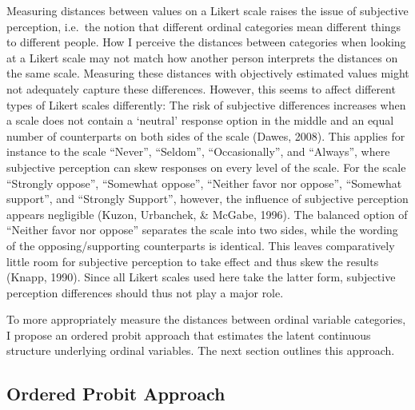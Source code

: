 \documentclass[12pt,econ]{sources/authesis}
\begin{document}
Measuring distances between values on a Likert scale raises the issue of subjective perception, i.e.~the notion that different ordinal categories mean different things to different people. How I perceive the distances between categories when looking at a Likert scale may not match how another person interprets the distances on the same scale. Measuring these distances with objectively estimated values might not adequately capture these differences. However, this seems to affect different types of Likert scales differently: The risk of subjective differences increases when a scale does not contain a `neutral' response option in the middle and an equal number of counterparts on both sides of the scale (Dawes, 2008). This applies for instance to the scale ``Never'', ``Seldom'', ``Occasionally'', and ``Always'', where subjective perception can skew responses on every level of the scale. For the scale ``Strongly oppose'', ``Somewhat oppose'', ``Neither favor nor oppose'', ``Somewhat support'', and ``Strongly Support'', however, the influence of subjective perception appears negligible (Kuzon, Urbanchek, \& McGabe, 1996). The balanced option of ``Neither favor nor oppose'' separates the scale into two sides, while the wording of the opposing/supporting counterparts is identical. This leaves comparatively little room for subjective perception to take effect and thus skew the results (Knapp, 1990). Since all Likert scales used here take the latter form, subjective perception differences should thus not play a major role.

To more appropriately measure the distances between ordinal variable categories, I propose an ordered probit approach that estimates the latent continuous structure underlying ordinal variables. The next section outlines this approach.

\hypertarget{ordblock-theory-op}{%
\subsection{Ordered Probit Approach}\label{ordblock-theory-op}}
\end{document}
